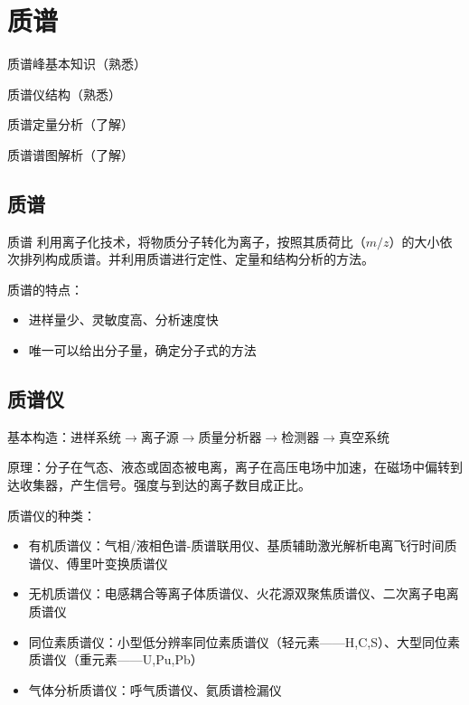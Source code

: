 \chapter{质谱}
\begin{introduction}
    \item 质谱峰基本知识（熟悉）
    \item 质谱仪结构（熟悉）
    \item 质谱定量分析（了解）
    \item 质谱谱图解析（了解）
\end{introduction}
\section{质谱}
\begin{definition*}{质谱}
    利用离子化技术，将物质分子转化为离子，按照其质荷比（$m/z$）的大小依次排列构成质谱。并利用质谱进行定性、定量和结构分析的方法。
\end{definition*}
质谱的特点：
\begin{itemize}
    \item 进样量少、灵敏度高、分析速度快
    \item 唯一可以给出分子量，确定分子式的方法
\end{itemize}


\section{质谱仪}

基本构造：进样系统$\rightarrow$离子源$\rightarrow$质量分析器$\rightarrow$检测器$\rightarrow$真空系统

原理：分子在气态、液态或固态被电离，离子在高压电场中加速，在磁场中偏转到达收集器，产生信号。强度与到达的离子数目成正比。

质谱仪的种类：
\begin{itemize}
    \item 有机质谱仪：气相/液相色谱-质谱联用仪、基质辅助激光解析电离飞行时间质谱仪、傅里叶变换质谱仪
    \item 无机质谱仪：电感耦合等离子体质谱仪、火花源双聚焦质谱仪、二次离子电离质谱仪
    \item 同位素质谱仪：小型低分辨率同位素质谱仪（轻元素——H,C,S）、大型同位素质谱仪（重元素——U,Pu,Pb）
    \item 气体分析质谱仪：呼气质谱仪、氦质谱检漏仪
\end{itemize}
